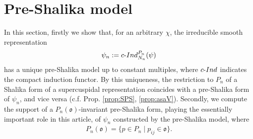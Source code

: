 \documentclass[11pt]{amsart}
\newcommand\oo{\mathfrak{o}}
\newcommand\1{\mathbf{1}}
\newcommand\cI{{\rm c\mathchar`- Ind}}
\numberwithin{equation}{section}
\begin{document}
\section{Pre-Shalika model}\label{sec:PSM}
In this section, firstly we show that, for an arbitrary $\chi$, the irreducible smooth representation
\begin{align}
\psi_n := \cI_{N_{n}}^{P_{n}}(\psi) \label{def:psim}
\end{align}
has a unique pre-Shalika model up to constant multiples, where $\cI$ indicates the compact induction functor.
By this uniqueness, the restriction to $P_n$ of a Shalika form of a supercuspidal representation coincides with a pre-Shalika form of $\psi_n$, and vice versa (c.f. Prop. \ref{prop:SPS}, \ref{prop:asaV}).
Secondly, we compute the support of a $P_n(\oo)$-invariant pre-Shalika form, playing the essentially important role in this article, of $\psi_n$ constructed by the pre-Shalika model, where 
\begin{align*}
P_n(\oo) = \{p \in P_n \mid p_{ij} \in \oo \}.
\end{align*} 
\end{document}
